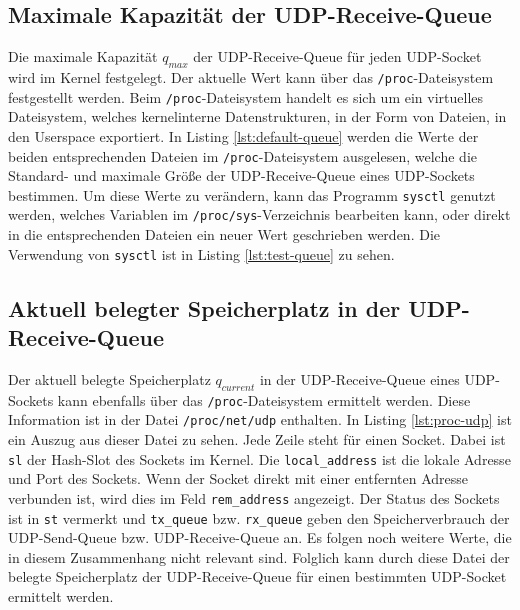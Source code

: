 \documentclass[a4paper, 12pt, BCOR10mm, DIV12, toc=bibliography, toc=listof, german]{scrbook}
\begin{document}
		\subsection*{Maximale Kapazität der UDP-Receive-Queue} %

		
		

		Die maximale Kapazität $q_{max}$ der UDP-Receive-Queue für jeden UDP-Socket wird im Kernel festgelegt. Der
		aktuelle Wert kann über das \texttt{/proc}-Dateisystem festgestellt werden. Beim
		\texttt{/proc}-Dateisystem \cite{benvenuti2005} handelt es sich um ein virtuelles Dateisystem,
		welches kernelinterne Datenstrukturen, in der Form von Dateien, in den Userspace exportiert. In
		Listing \ref{lst:default-queue} werden die Werte der beiden entsprechenden Dateien im
		\texttt{/proc}-Dateisystem ausgelesen, welche die Standard- und maximale Größe der
		UDP-Receive-Queue eines UDP-Sockets bestimmen. Um diese Werte zu verändern, kann das Programm
		\texttt{sysctl} genutzt werden, welches Variablen im \texttt{/proc/sys}-Verzeichnis bearbeiten
		kann, oder direkt in die entsprechenden Dateien ein neuer Wert geschrieben werden. Die
		Verwendung von \texttt{sysctl} ist in Listing \ref{lst:test-queue} zu sehen.


		\subsection*{Aktuell belegter Speicherplatz in der UDP-Receive-Queue} %

		Der aktuell belegte Speicherplatz $q_{current}$ in der UDP-Receive-Queue eines UDP-Sockets kann
		ebenfalls über das \texttt{/proc}-Dateisystem ermittelt werden. Diese Information ist in der
		Datei \texttt{/proc/net/udp} enthalten. In Listing \ref{lst:proc-udp} ist ein Auszug aus dieser
		Datei zu sehen. Jede Zeile steht für einen Socket. Dabei ist \texttt{sl} der Hash-Slot des
		Sockets im Kernel. Die \texttt{local\_address} ist die lokale Adresse und Port des Sockets. Wenn
		der Socket direkt  mit einer entfernten Adresse verbunden ist, wird dies im Feld
		\texttt{rem\_address} angezeigt.  Der Status des Sockets ist in \texttt{st} vermerkt und
		\texttt{tx\_queue} bzw.  \texttt{rx\_queue} geben den Speicherverbrauch der UDP-Send-Queue bzw.
		UDP-Receive-Queue an. Es folgen noch weitere Werte, die in diesem Zusammenhang nicht relevant
		sind. Folglich kann durch diese Datei der belegte Speicherplatz der UDP-Receive-Queue für einen
		bestimmten UDP-Socket ermittelt werden.
\end{document}
